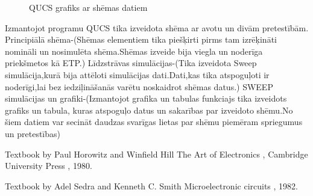 \documentclass{report}
\begin{document}
\begin{figure}[]
\caption{QUCS grafiks ar shēmas datiem }
\label{5}
\end{figure}

Izmantojot programu QUCS\cite{gramata1} tika izveidota shēma ar avotu un divām pretestībām.
Principiālā shēma-(Shēmas elementiem\cite{gramata2} tika piešķirti pirms tam izrēķināti nomināli un nosimulēta shēma.Shēmas izveide bija viegla un noderīga priekšmetos kā ETP.)
Līdzstrāvas simulācijas-(Tika izveidota Sweep simulācija,kurā bija attēloti simulācijas dati.Dati,kas tika atspoguļoti ir noderīgi,lai bez iedziļināšanās varētu noskaidrot shēmas datus.)
SWEEP simulācijas un grafiki-(Izmantojot grafika un tabulas funkciajs tika izveidots grafiks un tabula, kuras atspoguļo datus un sakarības par izveidoto shēmu.No šiem datiem var secināt daudzas svarīgas lietas par shēmu piemēram spriegumus un pretestības)



\begin{thebibliography}{9}
Textbook by Paul Horowitz and Winfield Hill
The Art of Electronics , Cambridge University Press , 1980.

Textbook by Adel Sedra and Kenneth C. Smith
Microelectronic circuits , 1982.
\end{thebibliography}
\end{document}
